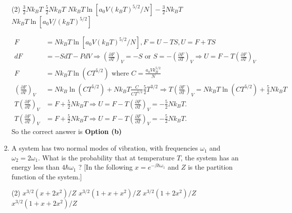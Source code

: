 \begin{enumerate}
	{	}
	\begin{tasks}(2)
		\task[\textbf{a.}]$\frac{3}{2} N k_{B} T$
		\task[\textbf{b.}]$\frac{5}{2} N k_{B} T$
		\task[\textbf{c.}]$N k_{B} T \ln \left[a_{0} V\left(k_{B} T\right)^{5 / 2} / N\right]-\frac{3}{2} N k_{B} T$
		\task[\textbf{d.}]  $N k_{B} T \ln \left[a_{0} V /\left(k_{B} T\right)^{5 / 2}\right]$
	\end{tasks}	
	\begin{answer}
		\begin{align*}
		F&=N k_{B} T \ln \left[a_{0} V\left(k_{B} T\right)^{5 / 2} / N\right], F=U-T S, U=F+T S\\
		d F&=-S d T-P d V \Rightarrow\left(\frac{\partial F}{\partial T}\right)_{V}=-S \text { or } S=-\left(\frac{\partial F}{\partial T}\right)_{V} \Rightarrow U=F-T\left(\frac{\partial F}{\partial T}\right)_{V} \\
		F&=N k_{B} T \ln \left(C T^{5 / 2}\right) \text { where } C=\frac{a_{0} V k_{B}^{5 / 2}}{N} \\
		\left(\frac{\partial F}{\partial T}\right)_{V}&=N k_{B} \ln \left(C T^{5 / 2}\right)+N k_{B} T \frac{C}{C T^{5 / 2}} \frac{5}{2} T^{3 / 2} \Rightarrow T\left(\frac{\partial F}{\partial T}\right)_{V}=N k_{B} T \ln \left(C T^{5 / 2}\right)+\frac{5}{2} N k_{B} T \\
		T\left(\frac{\partial F}{\partial T}\right)_{V}&=F+\frac{5}{2} N k_{B} T \Rightarrow U=F-T\left(\frac{\partial F}{\partial T}\right)_{V}=-\frac{5}{2} N k_{B} T .\\
		T\left(\frac{\partial F}{\partial T}\right)_{V}&=F+\frac{5}{2} N k_{B} T \Rightarrow U=F-T\left(\frac{\partial F}{\partial T}\right)_{V}=-\frac{5}{2} N k_{B} T .
		\end{align*}
		So the correct answer is \textbf{Option (b)}
	\end{answer}
	\item A system has two normal modes of vibration, with frequencies $\omega_{1}$ and $\omega_{2}=2 \omega_{1}$. What is the probability that at temperature $T$, the system has an energy less than $4 \hbar \omega_{1}$ ?
	[In the following $x=e^{-\beta \hbar \omega_{1}}$ and $Z$ is the partition function of the system.]
	{	}
	\begin{tasks}(2)
		\task[\textbf{a.}]$x^{3 / 2}\left(x+2 x^{2}\right) / Z$
		\task[\textbf{b.}]$x^{3 / 2}\left(1+x+x^{2}\right) / Z$
		\task[\textbf{c.}]$x^{3 / 2}\left(1+2 x^{2}\right) / Z$
		\task[\textbf{d.}] $x^{3 / 2}\left(1+x+2 x^{2}\right) / Z$
	\end{tasks}

\end{enumerate}
